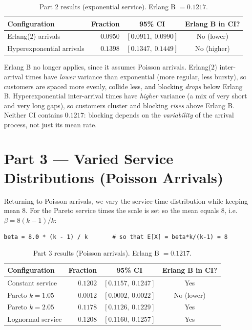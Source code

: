 \begin{table}[h]
    \centering
    \caption{Part 2 results (exponential service). Erlang B $= 0.1217$.}
    \label{tab:part2}
    \renewcommand{\arraystretch}{1.1}
    \begin{tabular}{lrcc}
        \toprule
        Configuration & Fraction & 95\% CI & Erlang B in CI? \\
        \midrule
        Erlang($2$) arrivals      & $0.0950$ & $[0.0911,\ 0.0990]$ & No (lower)  \\
        Hyperexponential arrivals & $0.1398$ & $[0.1347,\ 0.1449]$ & No (higher) \\
        \bottomrule
    \end{tabular}
\end{table}

Erlang B no longer applies, since it assumes Poisson arrivals. Erlang($2$)
inter-arrival times have \emph{lower} variance than exponential (more regular,
less bursty), so customers are spaced more evenly, collide less, and blocking
\emph{drops} below Erlang B. Hyperexponential inter-arrival times have
\emph{higher} variance (a mix of very short and very long gaps), so customers
cluster and blocking \emph{rises} above Erlang B. Neither CI contains $0.1217$:
blocking depends on the \emph{variability} of the arrival process, not just its
mean rate.

\section*{Part 3 --- Varied Service Distributions (Poisson Arrivals)}

Returning to Poisson arrivals, we vary the service-time distribution while
keeping mean $8$. For the Pareto service times the scale is set so the mean
equals $8$, i.e.\ $\beta = 8(k-1)/k$:
\begin{verbatim}
beta = 8.0 * (k - 1) / k       # so that E[X] = beta*k/(k-1) = 8
\end{verbatim}

\begin{table}[h]
    \centering
    \caption{Part 3 results (Poisson arrivals). Erlang B $= 0.1217$.}
    \label{tab:part3}
    \renewcommand{\arraystretch}{1.1}
    \begin{tabular}{lrcc}
        \toprule
        Configuration & Fraction & 95\% CI & Erlang B in CI? \\
        \midrule
        Constant service   & $0.1202$ & $[0.1157,\ 0.1247]$ & Yes        \\
        Pareto $k=1.05$     & $0.0012$ & $[0.0002,\ 0.0022]$ & No (lower) \\
        Pareto $k=2.05$     & $0.1178$ & $[0.1126,\ 0.1229]$ & Yes        \\
        Lognormal service   & $0.1208$ & $[0.1160,\ 0.1257]$ & Yes        \\
        \bottomrule
    \end{tabular}
\end{table}

